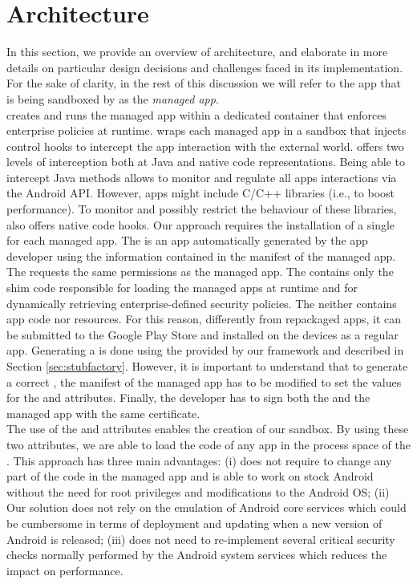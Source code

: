 \section{\asd Architecture}
\label{sec:arch}
In this section, we provide an overview of \asd architecture, and elaborate in more details on particular design decisions and challenges faced in its implementation. For the sake of clarity, in the rest of this discussion we will refer to the app that is being sandboxed by \asd as the \textit{managed app}. \\
\asd creates and runs the managed app within a dedicated container that enforces enterprise policies at runtime. 
\asd wraps each managed app in a sandbox that injects control hooks to intercept the app interaction with the external world. \asd offers two levels of interception both at Java and native code representations. Being able to intercept Java methods allows \asd to monitor and regulate all apps interactions via the Android API. However, apps might include C/C++ libraries (i.e., to boost performance). To monitor and possibly restrict the behaviour of these libraries, \asd also offers native code hooks. 
Our approach requires the installation of a single \stub for each managed app. The \stub is an app automatically generated by the app developer using the information contained in the manifest of the managed app. The \stub requests the same permissions as the managed app. The \stub contains only the shim code responsible for loading the managed apps at runtime and for dynamically retrieving enterprise-defined security policies. The \stub neither contains app code nor resources. For this reason, differently from repackaged apps, it can be submitted to the Google Play Store and installed on the devices as a regular app. Generating a \stub  is done using the \stubMaker provided by our framework and described in  Section \ref{sec:stubfactory}. However, it is important to understand that to generate a correct \stub, the manifest of the managed app has to be modified to set the values for the \shared and \proc attributes. Finally, the developer has to sign both the \stub and the managed app with the same certificate. \\

The use of the \proc and \shared attributes enables the creation of our sandbox. By using these two attributes, we are able to load the code of any app in the process space of the \stub. This approach has three main advantages: (i) \asd does not require to change any part of the code in the managed app and is able to work on stock Android without the need for root privileges and modifications to the Android OS; (ii) Our solution does not rely on the emulation of Android core services which could be cumbersome in terms of deployment and updating when a new version of Android is released; (iii) \asd does not need to re-implement several critical security checks normally performed by the Android system services which reduces the impact on performance. 

